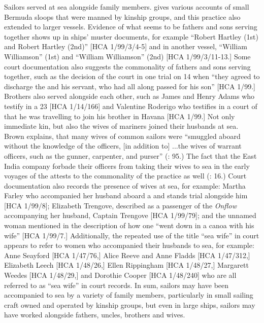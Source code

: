   Sailors served at sea alongside family members. \citet{Jarvis2010} gives various accounts of small Bermuda sloops that were manned by kinship groups, and this practice also extended to larger vessels. Evidence of what seems to be fathers and sons serving together shows up in ships’ muster documents, for example “Robert Hartley (1st) and Robert Hartley (2nd)” [HCA 1/99/3/4-5] and in another vessel, “William Williamson” (1st) and “William Williamson” (2nd) [HCA 1/99/3/11-13.] Some court documentation also suggests the commonality of fathers and sons serving together, such as the decision of the court in one  trial on 14 \citealt{August1729} when “they agreed to discharge the  and his servant, who had all along passed for his son” [HCA 1/99.]  Brothers also served alongside each other, such as James and Henry Adams who testify in a  23 \citealt{October1699} [HCA 1/14/166] and Valentine Roderigo who testifies in a court of  \citealt{Island1722} that he was travelling to join his brother in Havana [HCA 1/99.] Not only immediate kin, but also the wives of mariners joined their husbands at sea. Brown explains, that many wives of common sailors were “smuggled aboard without the knowledge of the officers, [in addition to] ...the wives of warrant officers, such as the gunner, carpenter, and purser” (\citealt{Brown2011}: 95.) The fact that the East India company forbade their officers from taking their wives to sea in the early voyages of the  attests to the commonality of the practice as well (\citealt{Fury2015}: 16.) Court documentation also records the presence of wives at sea, for example: Martha Farley who accompanied her husband aboard a  and stands trial alongside him [HCA 1/99/8]; Elizabeth Trengove, described as a passenger of the \textit{Onflow} accompanying her husband, Captain Trengove [HCA 1/99/79]; and the unnamed woman mentioned in the description of how one  “went down in a canoa with his wife” [HCA 1/99/7.] Additionally, the repeated use of the title “sea wife” in court appears to refer to women who accompanied their husbands to sea, for example: Anne Seayford [HCA 1/47/76,] Alice Reeve and Anne Fladds [HCA 1/47/312,] Elizabeth Leech [HCA 1/48/26,] Ellen Rippingham [HCA 1/48/27,] Margarett Weedes [HCA 1/48/29,] and Dorothie Cooper [HCA 1/48/240] who are all referred to as “sea wife” in court records. In sum, sailors may have been accompanied to sea by a variety of family members, particularly in small sailing craft owned and operated by kinship groups, but even in large ships, sailors may have worked alongside fathers, uncles, brothers and wives. 

